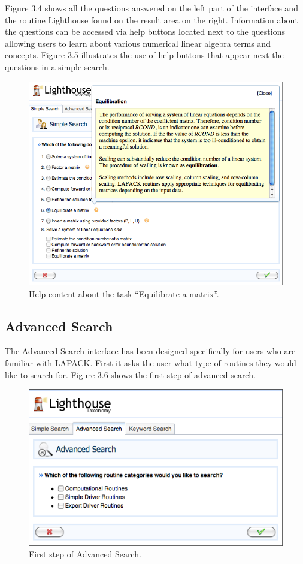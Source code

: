 Figure 3.4 shows all the questions answered on the left part of the interface and the routine Lighthouse found on the result area on the right. Information about the questions can be accessed via help buttons located next to the questions allowing users to learn about various numerical linear algebra terms and concepts. Figure 3.5 illustrates the use of help buttons that appear next the questions in a simple search.

\begin{figure}[h!]\label{simplesearch4}
  \centering
  \includegraphics[width=5in]{figs/simplesearch4}
  \caption[Help content about the task ``equilibrate a matrix'']
   {Help content about the task “Equilibrate a matrix”.}
\end{figure}

\subsection{Advanced Search}
The Advanced Search interface has been designed specifically for users who are familiar with LAPACK. First it asks the user what type of routines they would like to search for. Figure 3.6 shows the first step of advanced search.

\begin{figure}[h!]\label{advancedsearch1}
  \centering
  \includegraphics[width=5in]{figs/advancedsearch1}
  \caption[First step of Advanced Search]
   {First step of Advanced Search.}
\end{figure}

